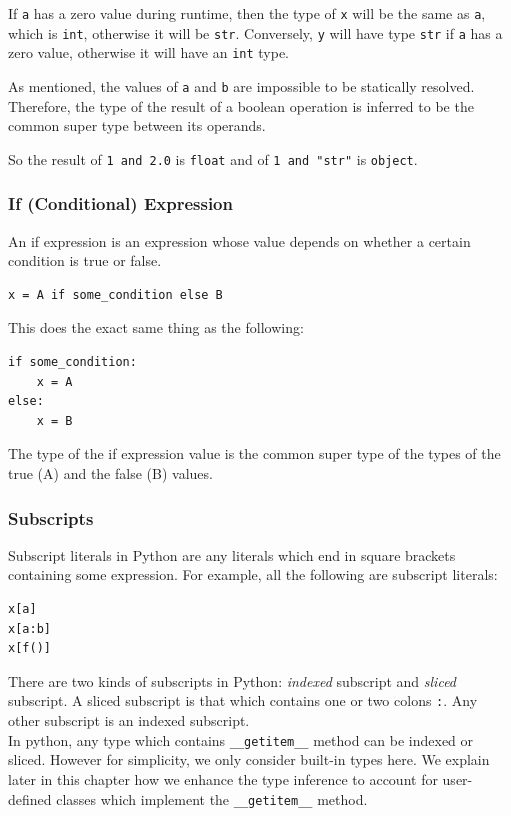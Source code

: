 If \lstinline|a| has a zero value during runtime, then the type of \lstinline|x| will be the same as \lstinline|a|, which is \lstinline|int|, otherwise it will be \lstinline|str|. Conversely, \lstinline|y| will have type \lstinline|str| if \lstinline|a| has a zero value, otherwise it will have an \lstinline|int| type.

As mentioned, the values of \lstinline|a| and \lstinline|b| are impossible to be statically resolved. Therefore, the type of the result of a boolean operation is inferred to be the common super type between its operands.

So the result of \lstinline|1 and 2.0| is \lstinline|float| and of \lstinline|1 and "str"| is \lstinline|object|.

\subsubsection{If (Conditional) Expression}
An if expression is an expression whose value depends on whether a certain condition is true or false.
\begin{lstlisting}
x = A if some_condition else B
\end{lstlisting}
This does the exact same thing as the following:
\begin{lstlisting}
if some_condition:
	x = A
else:
	x = B
\end{lstlisting}

The type of the if expression value is the common super type of the types of the true (A) and the false (B) values.

\subsubsection{Subscripts}
Subscript literals in Python are any literals which end in square brackets containing some expression. For example, all the following are subscript literals:
\begin{lstlisting}
x[a]
x[a:b]
x[f()]
\end{lstlisting}

There are two kinds of subscripts in Python: \textit{indexed} subscript and \textit{sliced} subscript. A sliced subscript is that which contains one or two colons \lstinline|:|. Any other subscript is an indexed subscript. \\

In python, any type which contains \lstinline|__getitem__| method can be indexed or sliced. However for simplicity, we only consider built-in types here. We explain later in this chapter how we enhance the type inference to account for user-defined classes which implement the \lstinline|__getitem__| method. \\


